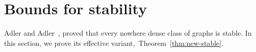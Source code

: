 
\section{Bounds for stability}\label{sec:stable}
Adler and Adler~\cite{adler2014interpreting}, 
proved that every nowhere dense class of graphs is stable. In this section,
we prove its effective variant,~Theorem~\ref{thm:new-stable}.
%
\vspace{-2mm}

